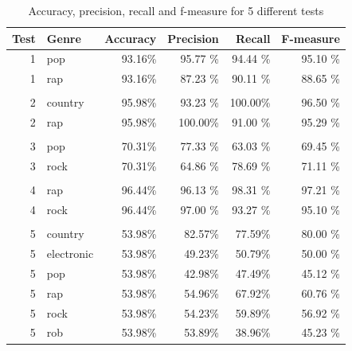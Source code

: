 \documentclass[a4paper, 12pt]{article}
\begin{document}
\begin{table}[h]
\begin{center}
    \begin{tabular}{| r | l | r | r | r | r |}
        \hline
        Test & Genre & Accuracy & Precision & Recall & F-measure \\
        \hline
        1   & pop           & 93.16\%   & 95.77 \%  & 94.44 \%  & 95.10 \%  \\ \hline
        1   & rap           & 93.16\%   & 87.23 \%  & 90.11 \%  & 88.65 \%  \\ \hline
            &               &           &           &           &           \\ \hline
        2   & country       & 95.98\%   & 93.23 \%  & 100.00\%  & 96.50 \%  \\ \hline
        2   & rap           & 95.98\%   & 100.00\%  & 91.00 \%  & 95.29 \%  \\ \hline
            &               &           &           &           &           \\ \hline
        3   & pop           & 70.31\%   & 77.33 \%  & 63.03 \%  & 69.45 \%  \\ \hline
        3   & rock          & 70.31\%   & 64.86 \%  & 78.69 \%  & 71.11 \%  \\ \hline
            &               &           &           &           &           \\ \hline
        4   & rap           & 96.44\%   & 96.13 \%  & 98.31 \%  & 97.21 \%  \\ \hline
        4   & rock          & 96.44\%   & 97.00 \%  & 93.27 \%  & 95.10 \%  \\ \hline
            &               &           &           &           &           \\ \hline
        5   & country       & 53.98\%   & 82.57\%   & 77.59\%   & 80.00 \%  \\ \hline
        5   & electronic    & 53.98\%   & 49.23\%   & 50.79\%   & 50.00 \%  \\ \hline
        5   & pop           & 53.98\%   & 42.98\%   & 47.49\%   & 45.12 \%  \\ \hline
        5   & rap           & 53.98\%   & 54.96\%   & 67.92\%   & 60.76 \%  \\ \hline
        5   & rock          & 53.98\%   & 54.23\%   & 59.89\%   & 56.92 \%  \\ \hline
        5   & rob           & 53.98\%   & 53.89\%   & 38.96\%   & 45.23 \%  \\ \hline
    \end{tabular}
    \caption{Accuracy, precision, recall and f-measure for 5 different tests}
    \label{tab:res-stats1}
\end{center}
\end{table}
\end{document}
